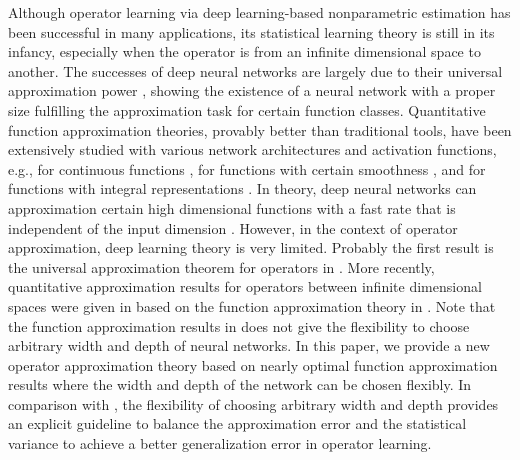 \documentclass[11pt]{article} %
\begin{document}
Although operator learning via deep learning-based nonparametric estimation 
has been successful in many applications, its statistical learning theory is still in its infancy, especially when the operator is from an infinite dimensional space to another. The successes of deep neural networks are largely due to their universal approximation power \citep{cybenko1989approximation,hornik1991approximation}, %
showing the existence of a neural network with a proper size fulfilling the approximation task for certain function classes. Quantitative function approximation theories, provably better than traditional tools, have been extensively studied with various network architectures and activation functions, e.g., for continuous functions \citep{yarotsky2017error,shijun2,shijun4,shijun5,shijun6,yarotsky:2021:02}, for functions with certain smoothness \citep{yarotsky18a,yarotsky:2019:06,shijun3,suzuki2018adaptivity}, and for functions with integral representations \citep{barron1993,Weinan2019,flow,siegel2021sharp}. In theory, deep neural networks can approximation certain high dimensional functions with a fast rate that is independent of the input dimension \citep{barron1993,Weinan2019,flow,siegel2021sharp,shijun4,shijun5,yarotsky:2019:06,shijun7,chen1995universal,chen2019nonparametric,chen2020doubly,hao2021icml,Jiao2021DeepNR,cloninger2020relu,shaham2018provable,schmidt2019deep,du2021discovery,nakada2020adaptive}. However, in the context of operator approximation, deep learning theory is very limited. Probably the first result is the universal approximation theorem for operators in \citep{chen1995universal}. More recently, quantitative approximation results for operators between infinite dimensional spaces were given in \citep{bhattacharya2020model,lanthaler2021error,kovachki2021universal} based on the function approximation theory in \citep{yarotsky2017error}.  Note that the function approximation results in \citep{yarotsky2017error} does not give the flexibility to choose arbitrary width and depth of neural networks. In this paper, we provide a new operator approximation theory based on nearly optimal function approximation results where the width and depth of the network can be chosen flexibly. In comparison with \citep{lanthaler2021error}, the flexibility of choosing arbitrary width and depth provides an explicit guideline to balance the approximation error and the statistical variance to achieve a better generalization error in operator learning.
\end{document}
